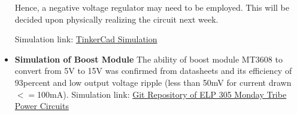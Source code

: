 \documentclass[12pt,a4paper]{article}
\begin{document}
\begin{itemize}
Hence, a negative voltage regulator may need to be employed. This will be decided upon physically realizing the circuit next week.

Simulation link: \href{https://www.tinkercad.com/things/gf0q0Ncw5p9/editel?sharecode=jc-TJ9JB5M20FsJDGMxoH8T5PApp168cANJCAp8Wo6Q}{TinkerCad Simulation}

\item \textbf{Simulation of Boost Module}
The ability of boost module MT3608 to convert from 5V to 15V was confirmed from datasheets and its efficiency of 93percent and low output voltage ripple (less than 50mV for current drawn $<=$100mA).
Simulation link: \href{https://github.com/lisha-goel/elp305_power}{Git Repository of ELP 305 Monday Tribe Power Circuits}
\end{itemize}

\clearpage
\end{document}
